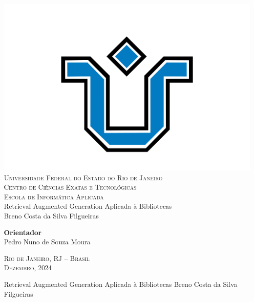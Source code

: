 \documentclass[a4paper, 12pt]{article}
\begin{document}
\setcounter{page}{1}

\thispagestyle{empty}

    \begin{center}
        \includegraphics[scale=0.18]{../images/unirio.png}\\
        \fontsize{13}{15}
        \textsc{
            Universidade Federal do Estado do Rio de Janeiro\\
            Centro de Ciências Exatas e Tecnológicas\\
            Escola de Informática Aplicada\\
        }
        \vspace{2.8cm}
        Retrieval Augmented Generation Aplicada à Bibliotecas\\
        \vspace{2.8cm}
        Breno Costa da Silva Filgueiras
        \vspace{2.8cm}

        \begin{flushright}
            \textbf{Orientador}\\
            Pedro Nuno de Souza Moura
        \end{flushright}

        \vspace*{\fill}
        
        \textsc{Rio de Janeiro, RJ -- Brasil\\ Dezembro, 2024}
    \end{center}

    \clearpage

    \begin{center}
        Retrieval Augmented Generation Aplicada à Bibliotecas
        \vskip 0.5cm
        Breno Costa da Silva Filgueiras
        \vskip 2.0cm
    \end{center}
\end{document}
